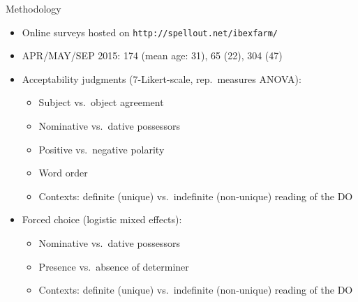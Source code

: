 \documentclass[12pt]{beamer}
\begin{document}
\begin{frame}{Methodology}

    \begin{itemize}

        \item Online surveys hosted on \texttt{http://spellout.net/ibexfarm/}

        \item APR/MAY/SEP 2015: 174 (mean age: 31), 65 (22), 304 (47)

        \item Acceptability judgments (7-Likert-scale, rep.\ measures ANOVA):

            \begin{itemize}

                \item Subject vs.~object agreement

                \item Nominative vs.~dative possessors

                \item Positive vs.~negative polarity

                \item Word order

                \item Contexts: definite (unique) vs.~indefinite (non-unique) reading of the DO

            \end{itemize}

        \item Forced choice (logistic mixed effects):

            \begin{itemize}

                \item Nominative vs.~dative possessors

                \item Presence vs.~absence of determiner

                \item Contexts: definite (unique) vs.~indefinite (non-unique) reading of the DO

            \end{itemize}

    \end{itemize}

\end{frame}
\end{document}
